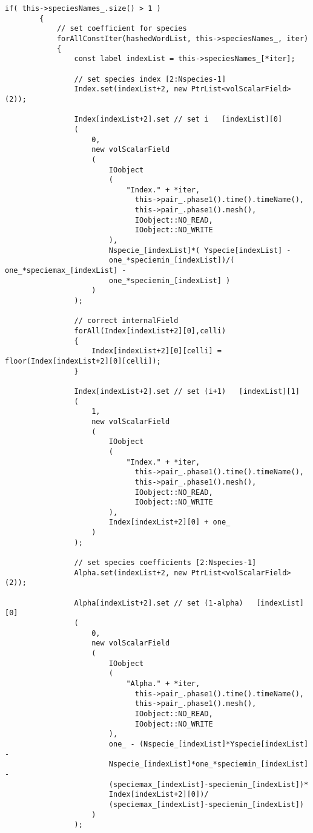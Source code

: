 \documentclass[a4paper, 12 pt, fleqn]{article}
\begin{document}
\begin{lstlisting}[gobble=7]
        if( this->speciesNames_.size() > 1 )
        {
            // set coefficient for species
            forAllConstIter(hashedWordList, this->speciesNames_, iter) 
            {
                const label indexList = this->speciesNames_[*iter]; 

                // set species index [2:Nspecies-1]
                Index.set(indexList+2, new PtrList<volScalarField>(2));
 
                Index[indexList+2].set // set i   [indexList][0]
                (
                    0,
                    new volScalarField
                    (
                        IOobject
                        (
                            "Index." + *iter,
	                          this->pair_.phase1().time().timeName(),
	                          this->pair_.phase1().mesh(),
	                          IOobject::NO_READ,
	                          IOobject::NO_WRITE
                        ),
                        Nspecie_[indexList]*( Yspecie[indexList] - 
                        one_*speciemin_[indexList])/( one_*speciemax_[indexList] -
                        one_*speciemin_[indexList] )
                    )
                );

                // correct internalField
                forAll(Index[indexList+2][0],celli)
                {
                    Index[indexList+2][0][celli] = floor(Index[indexList+2][0][celli]);
                }  

                Index[indexList+2].set // set (i+1)   [indexList][1]
                (
                    1,
                    new volScalarField
                    (
                        IOobject
                        (
                            "Index." + *iter,
	                          this->pair_.phase1().time().timeName(),
	                          this->pair_.phase1().mesh(),
	                          IOobject::NO_READ,
	                          IOobject::NO_WRITE
                        ),
                        Index[indexList+2][0] + one_
                    )
                );

                // set species coefficients [2:Nspecies-1]
                Alpha.set(indexList+2, new PtrList<volScalarField>(2));
 
                Alpha[indexList+2].set // set (1-alpha)   [indexList][0]
                (
                    0,
                    new volScalarField
                    (
                        IOobject
                        (
                            "Alpha." + *iter,
	                          this->pair_.phase1().time().timeName(),
	                          this->pair_.phase1().mesh(),
	                          IOobject::NO_READ,
	                          IOobject::NO_WRITE
                        ),
                        one_ - (Nspecie_[indexList]*Yspecie[indexList] -
                        Nspecie_[indexList]*one_*speciemin_[indexList] - 
                        (speciemax_[indexList]-speciemin_[indexList])*
                        Index[indexList+2][0])/
                        (speciemax_[indexList]-speciemin_[indexList])
                    )
                );


\end{lstlisting}
\end{document}
